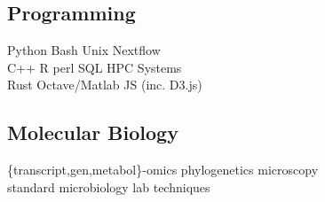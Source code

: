 \documentclass[]{Finlay_Maguire_CV}
\begin{document}
\begin{minipage}[t]{0.33\textwidth}
\subsection{Programming}
    \textit{}
    Python \textbullet{} Bash \textbullet{} Unix \textbullet{} Nextflow\\
    \textit{}
    C++ \textbullet{} R \textbullet{} perl \textbullet{} SQL \textbullet{} HPC Systems\\
    \textit{}
    Rust \textbullet{} Octave/Matlab \textbullet{} JS (inc. D3.js)\\
\sectionsep
\subsection{Molecular Biology}
\{transcript,gen,metabol\}-omics \textbullet{} phylogenetics \textbullet{} 
microscopy \textbullet{} \\ standard microbiology lab techniques 
\sectionsep



%
%

\end{minipage} 
\hfill
\end{document}

